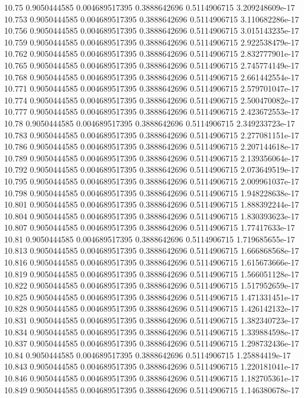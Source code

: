 {10.75 0.9050444585 0.004689517395 0.3888642696 0.5114906715 3.209248609e-17
10.753 0.9050444585 0.004689517395 0.3888642696 0.5114906715 3.110682286e-17
10.756 0.9050444585 0.004689517395 0.3888642696 0.5114906715 3.015143235e-17
10.759 0.9050444585 0.004689517395 0.3888642696 0.5114906715 2.922538479e-17
10.762 0.9050444585 0.004689517395 0.3888642696 0.5114906715 2.832777901e-17
10.765 0.9050444585 0.004689517395 0.3888642696 0.5114906715 2.745774149e-17
10.768 0.9050444585 0.004689517395 0.3888642696 0.5114906715 2.661442554e-17
10.771 0.9050444585 0.004689517395 0.3888642696 0.5114906715 2.579701047e-17
10.774 0.9050444585 0.004689517395 0.3888642696 0.5114906715 2.500470082e-17
10.777 0.9050444585 0.004689517395 0.3888642696 0.5114906715 2.423672553e-17
10.78 0.9050444585 0.004689517395 0.3888642696 0.5114906715 2.349233723e-17
10.783 0.9050444585 0.004689517395 0.3888642696 0.5114906715 2.277081151e-17
10.786 0.9050444585 0.004689517395 0.3888642696 0.5114906715 2.207144618e-17
10.789 0.9050444585 0.004689517395 0.3888642696 0.5114906715 2.139356064e-17
10.792 0.9050444585 0.004689517395 0.3888642696 0.5114906715 2.073649519e-17
10.795 0.9050444585 0.004689517395 0.3888642696 0.5114906715 2.009961037e-17
10.798 0.9050444585 0.004689517395 0.3888642696 0.5114906715 1.948228638e-17
10.801 0.9050444585 0.004689517395 0.3888642696 0.5114906715 1.888392244e-17
10.804 0.9050444585 0.004689517395 0.3888642696 0.5114906715 1.830393623e-17
10.807 0.9050444585 0.004689517395 0.3888642696 0.5114906715 1.77417633e-17
10.81 0.9050444585 0.004689517395 0.3888642696 0.5114906715 1.719685655e-17
10.813 0.9050444585 0.004689517395 0.3888642696 0.5114906715 1.666868568e-17
10.816 0.9050444585 0.004689517395 0.3888642696 0.5114906715 1.615673666e-17
10.819 0.9050444585 0.004689517395 0.3888642696 0.5114906715 1.566051128e-17
10.822 0.9050444585 0.004689517395 0.3888642696 0.5114906715 1.517952659e-17
10.825 0.9050444585 0.004689517395 0.3888642696 0.5114906715 1.471331451e-17
10.828 0.9050444585 0.004689517395 0.3888642696 0.5114906715 1.426142132e-17
10.831 0.9050444585 0.004689517395 0.3888642696 0.5114906715 1.382340723e-17
10.834 0.9050444585 0.004689517395 0.3888642696 0.5114906715 1.339884598e-17
10.837 0.9050444585 0.004689517395 0.3888642696 0.5114906715 1.298732436e-17
10.84 0.9050444585 0.004689517395 0.3888642696 0.5114906715 1.25884419e-17
10.843 0.9050444585 0.004689517395 0.3888642696 0.5114906715 1.220181041e-17
10.846 0.9050444585 0.004689517395 0.3888642696 0.5114906715 1.182705361e-17
10.849 0.9050444585 0.004689517395 0.3888642696 0.5114906715 1.146380678e-17
}

